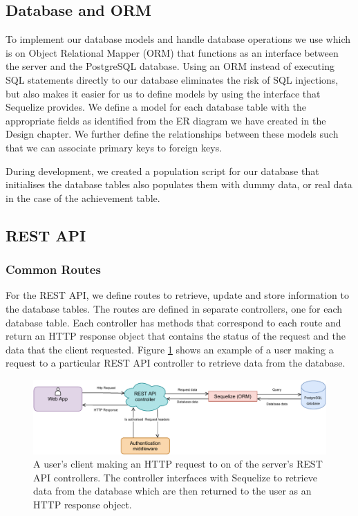 \documentclass{l4proj}
\begin{document}
\subsection{Database and ORM}
To implement our database models and handle database operations we use \cite{sequelize} which is on Object Relational Mapper (ORM) that functions as an interface between the server and the PostgreSQL database. Using an ORM instead of executing SQL statements directly to our database eliminates the risk of SQL injections, but also makes it easier for us to define models by using the interface that Sequelize provides. We define a model for each database table with the appropriate fields as identified from the ER diagram we have created in the Design chapter. We further define the relationships between these models such that we can associate primary keys to foreign keys.

During development, we created a population script for our database that initialises the database tables also populates them with dummy data, or real data in the case of the achievement table. 

\subsection{REST API}

\subsubsection{Common Routes}
For the REST API, we define routes to retrieve, update and store information to the database tables. The routes are defined in separate controllers, one for each database table. Each controller has methods that correspond to each route and return an HTTP response object that contains the status of the request and the data that the client requested. Figure \ref{fig:restapi} shows an example of a user making a request to a particular REST API controller to retrieve data from the database.

\begin{figure}
    \centering
    \includegraphics[width=1\linewidth]{images/restapi.pdf}    

    \caption{A user's client making an HTTP request to on of the server's REST API controllers. The controller interfaces with Sequelize to retrieve data from the database which are then returned to the user as an HTTP response object.}

    \label{fig:restapi} 
\end{figure}
\end{document}

